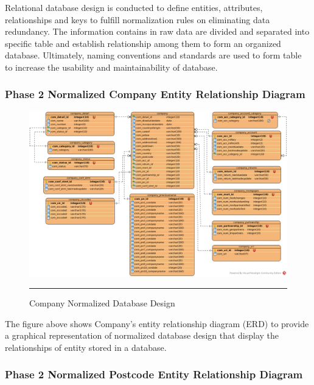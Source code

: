 Relational database design is conducted to define entities, attributes, relationships and keys to fulfill normalization rules on eliminating data redundancy. The information contains in raw data are divided and separated into specific table and establish relationship among them to form an organized database. Ultimately, naming conventions and standards are used to form table to increase the usability and maintainability of database. 

\subsubsection{Phase 2 Normalized Company Entity Relationship Diagram} 

\begin{figure}[H]
	\centering
	\includegraphics[width=1.1\textwidth]{FYP2/Chapter3/FYP2-Company-Normalized-ERD.png}
	\rule{35em}{0.5pt}
	\caption[Company Normalized Database Design]{Company Normalized Database Design}
\end{figure} 

The figure above shows Company's entity relationship diagram (ERD) to provide a graphical representation of normalized database design that display the relationships of entity stored in a database.

\subsubsection{Phase 2 Normalized Postcode Entity Relationship Diagram}

